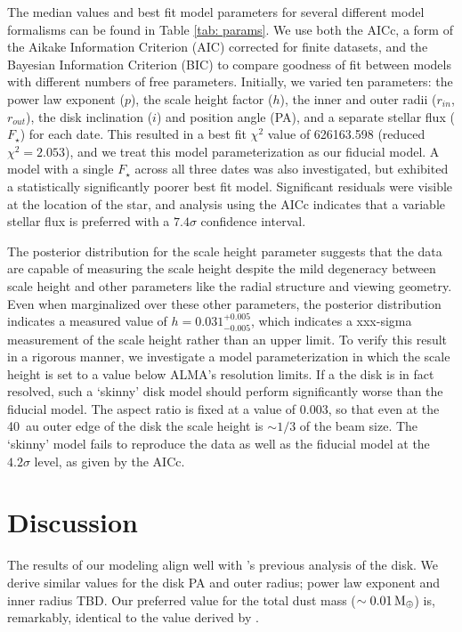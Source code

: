 \documentclass[12pt,oneside]{article}
\begin{document}
The median values and best fit model parameters for several different model formalisms can be found in Table \ref{tab: params}. 
We use both the AICc, a form of the Aikake Information Criterion (AIC) corrected for finite datasets, and the Bayesian Information Criterion (BIC) to compare goodness of fit between models with different numbers of free parameters.  
Initially, we varied ten parameters: the power law exponent ($p$), the scale height factor ($h$),  the inner and outer radii ($r_{in}$, $r_{out}$), the disk inclination  ($i$) and position angle (PA), and a separate stellar flux ($F_\star$) for each date. 
This resulted in a best fit $\chi^2$ value of 626163.598 (reduced $\chi^2=2.053$), and we treat this model parameterization as our fiducial model.
A model with a single $F_\star$ across all three dates was also investigated, but exhibited a statistically significantly poorer best fit model. 
Significant residuals were visible at the location of the star, and analysis using the AICc indicates that a variable stellar flux is preferred with a $7.4 \sigma$ confidence interval.

The posterior distribution for the scale height parameter suggests that the data are capable of measuring the scale height despite the mild degeneracy between scale height and other parameters like the radial structure and viewing geometry.  
Even when marginalized over these other parameters, the posterior distribution indicates a measured value of $h=0.031^{+0.005}_{-0.005}$, which indicates a xxx-sigma measurement of the scale height rather than an upper limit.
To verify this result in a rigorous manner, we investigate a model parameterization in which the scale height is set to a value below ALMA's resolution limits.
If a the disk is in fact resolved, such a `skinny' disk model should perform significantly worse than the fiducial model.
The aspect ratio is fixed at a value of $0.003$, so that even at the \SI{40}{au} outer edge of the disk the scale height is $\sim 1/3$ of the beam size.
The `skinny' model fails to reproduce the data as well as the fiducial model at the $4.2 \sigma$ level, as given by the AICc.


\section{Discussion}
\label{section: discussion}
The results of our modeling align well with \cite{macgregor13}'s previous analysis of the disk. We derive similar values for the disk PA and outer radius; power law exponent and inner radius TBD. Our preferred value for the total dust mass ($\sim \SI{0.01}{M_\oplus}$) is, remarkably, identical to the value derived by \cite{matthews15}.
\end{document}
